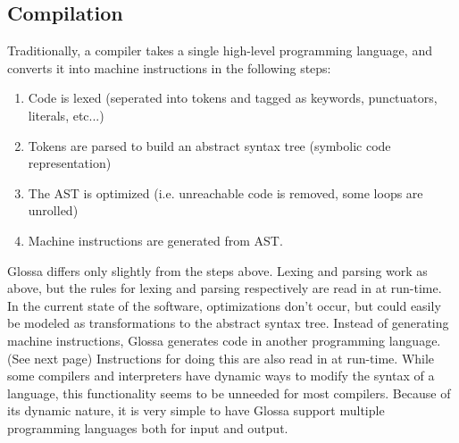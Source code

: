 \documentclass{article}
\begin{document}
\subsection{Compilation}
Traditionally, a compiler takes a single high-level programming language, and converts it into machine instructions in the following steps:
\begin{enumerate}
\item Code is lexed (seperated into tokens and tagged as keywords, punctuators, literals, etc...)
\item Tokens are parsed to build an abstract syntax tree (symbolic code representation)
\item The AST is optimized (i.e. unreachable code is removed, some loops are unrolled)
\item Machine instructions are generated from AST.
\end{enumerate}

Glossa differs only slightly from the steps above. Lexing and parsing work as above, but the rules for lexing and parsing respectively are read in at run-time. 
In the current state of the software, optimizations don't occur, but could easily be modeled as transformations to the abstract syntax tree.
Instead of generating machine instructions, Glossa generates code in another programming language. (See next page) 
Instructions for doing this are also read in at run-time.
While some compilers and interpreters have dynamic ways to modify the syntax of a language, this functionality seems to be unneeded for most compilers.
Because of its dynamic nature, it is very simple to have Glossa support multiple programming languages both for input and output.

\newpage

\end{document}
